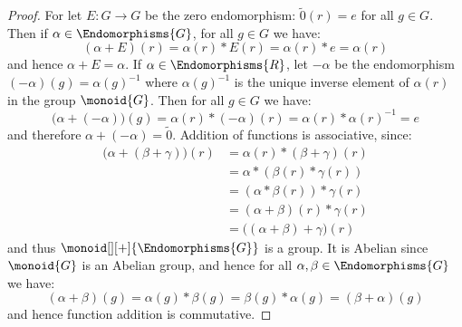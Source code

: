 \documentclass{book}                                                           %
\begin{document}
            \begin{proof}
                For let $E:G\rightarrow{G}$ be the zero
                endomorphism: $\tilde{0}(r)=e$ for all $g\in{G}$. Then if
                $\alpha\in\Endomorphisms{G}$, for all $g\in{G}$ we have:
                \begin{equation}
                    (\alpha+E)(r)=\alpha(r)*E(r)=\alpha(r)*e=\alpha(r)
                \end{equation}
                and hence $\alpha+E=\alpha$. If
                $\alpha\in\Endomorphisms{R}$, let $\minus{\alpha}$ be the
                endomorphism $(\minus\alpha)(g)=\alpha(g)^{\minus{1}}$
                where $\alpha(g)^{\minus{1}}$ is the unique inverse element
                of $\alpha(r)$ in the group $\monoid{G}$. Then for all
                $g\in{G}$ we have:
                \begin{equation}
                    \big(\alpha+(\minus{\alpha})\big)(g)
                    =\alpha(r)*(\minus\alpha)(r)
                    =\alpha(r)*\alpha(r)^{\minus{1}}
                    =e
                \end{equation}
                and therefore $\alpha+(\minus{\alpha})=\tilde{0}$. Addition
                of functions is associative, since:
                \begin{subequations}
                    \begin{align}
                        \big(\alpha+(\beta+\gamma)\big)(r)
                        &=\alpha(r)*(\beta+\gamma)(r)\\
                        &=\alpha*(\beta(r)*\gamma(r))\\
                        &=(\alpha*\beta(r))*\gamma(r)\\
                        &=(\alpha+\beta)(r)*\gamma(r)\\
                        &=\big((\alpha+\beta)+\gamma\big)(r)
                    \end{align}
                \end{subequations}
                and thus $\monoid[][+]{\Endomorphisms{G}}$ is a group. It is
                Abelian since $\monoid{G}$ is an Abelian group, and hence
                for all $\alpha,\beta\in\Endomorphisms{G}$ we have:
                \begin{equation}
                    (\alpha+\beta)(g)=\alpha(g)*\beta(g)
                        =\beta(g)*\alpha(g)
                        =(\beta+\alpha)(g)
                \end{equation}
                and hence function addition is commutative.
            \end{proof}
\end{document}

